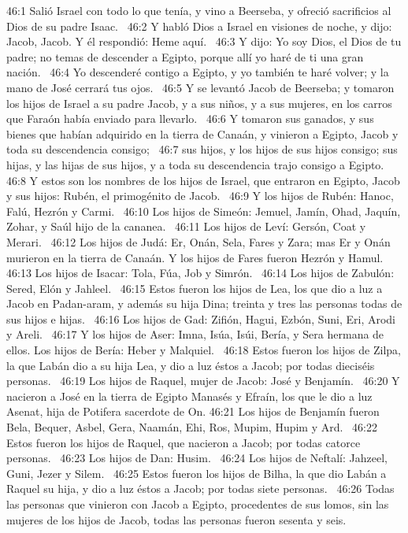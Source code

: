 46:1 Salió Israel con todo lo que tenía, y vino a Beerseba, y ofreció sacrificios al Dios de su padre Isaac.  
46:2 Y habló Dios a Israel en visiones de noche, y dijo: Jacob, Jacob. Y él respondió: Heme aquí.  
46:3 Y dijo: Yo soy Dios, el Dios de tu padre; no temas de descender a Egipto, porque allí yo haré de ti una gran nación.  
46:4 Yo descenderé contigo a Egipto, y yo también te haré volver; y la mano de José cerrará tus ojos.  
46:5 Y se levantó Jacob de Beerseba; y tomaron los hijos de Israel a su padre Jacob, y a sus niños, y a sus mujeres, en los carros que Faraón había enviado para llevarlo.  
46:6 Y tomaron sus ganados, y sus bienes que habían adquirido en la tierra de Canaán, y vinieron a Egipto, Jacob y toda su descendencia consigo;  
46:7 sus hijos, y los hijos de sus hijos consigo; sus hijas, y las hijas de sus hijos, y a toda su descendencia trajo consigo a Egipto.  
46:8 Y estos son los nombres de los hijos de Israel, que entraron en Egipto, Jacob y sus hijos: Rubén, el primogénito de Jacob.  
46:9 Y los hijos de Rubén: Hanoc, Falú, Hezrón y Carmi.  
46:10 Los hijos de Simeón: Jemuel, Jamín, Ohad, Jaquín, Zohar, y Saúl hijo de la cananea.  
46:11 Los hijos de Leví: Gersón, Coat y Merari.  
46:12 Los hijos de Judá: Er, Onán, Sela, Fares y Zara; mas Er y Onán murieron en la tierra de Canaán. Y los hijos de Fares fueron Hezrón y Hamul.  
46:13 Los hijos de Isacar: Tola, Fúa, Job y Simrón.  
46:14 Los hijos de Zabulón: Sered, Elón y Jahleel.  
46:15 Estos fueron los hijos de Lea, los que dio a luz a Jacob en Padan-aram, y además su hija Dina; treinta y tres las personas todas de sus hijos e hijas.  
46:16 Los hijos de Gad: Zifión, Hagui, Ezbón, Suni, Eri, Arodi y Areli.  
46:17 Y los hijos de Aser: Imna, Isúa, Isúi, Bería, y Sera hermana de ellos. Los hijos de Bería: Heber y Malquiel.  
46:18 Estos fueron los hijos de Zilpa, la que Labán dio a su hija Lea, y dio a luz éstos a Jacob; por todas dieciséis personas.  
46:19 Los hijos de Raquel, mujer de Jacob: José y Benjamín.  
46:20 Y nacieron a José en la tierra de Egipto Manasés y Efraín, los que le dio a luz Asenat, hija de Potifera sacerdote de On. 
46:21 Los hijos de Benjamín fueron Bela, Bequer, Asbel, Gera, Naamán, Ehi, Ros, Mupim, Hupim y Ard.  
46:22 Estos fueron los hijos de Raquel, que nacieron a Jacob; por todas catorce personas.  
46:23 Los hijos de Dan: Husim.  
46:24 Los hijos de Neftalí: Jahzeel, Guni, Jezer y Silem.  
46:25 Estos fueron los hijos de Bilha, la que dio Labán a Raquel su hija, y dio a luz éstos a Jacob; por todas siete personas.  
46:26 Todas las personas que vinieron con Jacob a Egipto, procedentes de sus lomos, sin las mujeres de los hijos de Jacob, todas las personas fueron sesenta y seis. 
